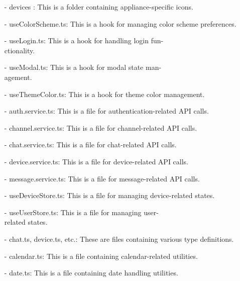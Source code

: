 \documentclass[conference]{IEEEtran}
\begin{document}
\begin{enumerate}
        \item[-] devices : This is a folder containing appliance-specific icons.\\
        \item[-] useColorScheme.ts: This is a hook for managing color scheme preferences. \\
        \item[-] useLogin.ts: This is a hook for handling login fun-\\ctionality. \\
        \item[-] useModal.ts: This is a hook for modal state man-\\agement. \\
        \item[-] useThemeColor.ts: This is a hook for theme color management.\\
        \item[-] auth.service.ts: This is a file for authentication-related API calls. \\
        \item[-] channel.service.ts: This is a file for channel-related API calls. \\
        \item[-] chat.service.ts: This is a file for chat-related API calls. \\
        \item[-] device.service.ts: This is a file for device-related API calls. \\
        \item[-] message.service.ts: This is a file for message-related API calls. \\
        \item[-] useDeviceStore.ts: This is a file for managing device-related states. \\
        \item[-] useUserStore.ts: This is a file for managing user-\\related states. \\
        \item[-] chat.ts, device.ts, etc.: These are files containing various type definitions. \\
        \item[-] calendar.ts: This is a file containing calendar-related utilities. \\
        \item[-] date.ts: This is a file containing date handling utilities.\\
        
\end{enumerate}
\end{document}
